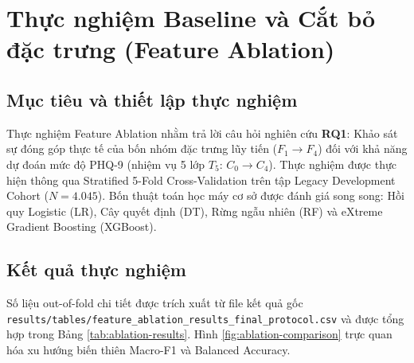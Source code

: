 \section{Thực nghiệm Baseline và Cắt bỏ đặc trưng (Feature Ablation)}
\label{sec:feature-ablation}

\subsection{Mục tiêu và thiết lập thực nghiệm}
Thực nghiệm Feature Ablation nhằm trả lời câu hỏi nghiên cứu \textbf{RQ1}: Khảo sát sự đóng góp thực tế của bốn nhóm đặc trưng lũy tiến ($F_1 \to F_4$) đối với khả năng dự đoán mức độ PHQ-9 (nhiệm vụ 5 lớp $T_5$: $C_0 \to C_4$). Thực nghiệm được thực hiện thông qua Stratified 5-Fold Cross-Validation trên tập Legacy Development Cohort ($N = 4.045$). Bốn thuật toán học máy cơ sở được đánh giá song song: Hồi quy Logistic (LR), Cây quyết định (DT), Rừng ngẫu nhiên (RF) và eXtreme Gradient Boosting (XGBoost).

\subsection{Kết quả thực nghiệm}
Số liệu out-of-fold chi tiết được trích xuất từ file kết quả gốc \texttt{results/tables/feature\_ablation\_results\_final\_protocol.csv} và được tổng hợp trong Bảng \ref{tab:ablation-results}. Hình \ref{fig:ablation-comparison} trực quan hóa xu hướng biến thiên Macro-F1 và Balanced Accuracy.

